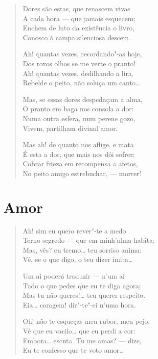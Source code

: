 \begin{verse}
Dores são estas, que renascem vivas\\
A cada hora --- que jamais esquecem;\\
Enchem de luto da existência o livro,\\
Conosco à campa silenciosa descem.

Ah! quantas vezes, recordando"-as hoje,\\
Dos roxos olhos se me verte o pranto!\\
Ah! quantas vezes, dedilhando a lira,\\
Rebelde o peito, não soluça um canto\ldots{}

Mas, se essas dores despedaçam a alma,\\
O pranto em baga nos consola a dor:\\
Numa outra esfera, num perene gozo,\\
Vivem, partilham divinal amor.

Mas ah! de quanto nos aflige, e mata\\
É esta a dor, que mais nos dói sofrer;\\
Cobrar frieza em recompensa a afetos,\\
No peito amigo estrebuchar, --- morrer!
\end{verse}

\chapter{Amor}

\begin{verse}
Ah! sim eu quero rever"-te a medo\\
Terno segredo --- que em minh'alma habita;\\
Mas, vês? eu tremo\ldots{} teu sorriso anima:\\
Vê, se o que digo, o teu dizer imita\ldots{}

Um ai poderá traduzir --- n'um ai\\
Tudo o que pedes que eu te diga agora;\\
Mas tu não queres!\ldots{} teu querer respeito.\\
Eia\ldots{} coragem! dir"-te"-ei n'uma hora.

Oh! não te esqueças meu rubor, meu pejo,\\
Vê que eu vacilo\ldots{} que eu perdi a cor:\\
Embora\ldots{} escuta. Tu me amas? --- dize,\\
Eu te confesso que te voto amor\ldots{}
\end{verse}

